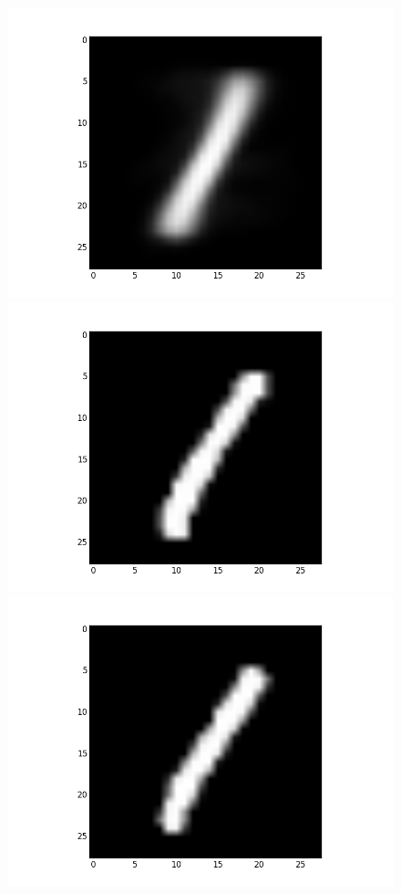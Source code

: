 \documentclass[submit]{harvardml}
\begin{document}
\begin{figure}[ht]
    \centering
    \includegraphics[scale=0.20]{mean-4}
    \includegraphics[scale=0.20]{representative-4-0}
    \includegraphics[scale=0.20]{representative-4-1}

\end{figure}
\end{document}
